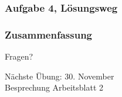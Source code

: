 \documentclass[c,18pt]{beamer}
\begin{document}
\begin{frame}[t]%
  \frametitle{Aufgabe 4, Lösungsweg}%
\medskip


\end{frame}


\def\kap{7}%
%


\begin{frame}
  \frametitle{Zusammenfassung}%
\tableofcontents[current]
\end{frame}

\begin{frame}
\centering
\Huge\textcolor{KITgreen}{Fragen?}
\vspace{2cm}

{\LARGE
N\"achste \"Ubung: 30. November\\
Besprechung Arbeitsblatt 2
}
\end{frame}


\end{document}
